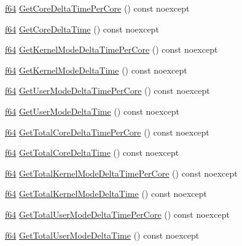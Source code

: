 \begin{DoxyCompactItemize}
\hyperlink{namespacemage_ab935747c6941320bd6214b5a5f265b09}{f64} \hyperlink{classmage_1_1_c_p_u_timer_a721f374b8ca33de787c744467d1e3656}{Get\+Core\+Delta\+Time\+Per\+Core} () const noexcept
\item 
\hyperlink{namespacemage_ab935747c6941320bd6214b5a5f265b09}{f64} \hyperlink{classmage_1_1_c_p_u_timer_a59d7c34a73f7f4eb670e93ac359c68e6}{Get\+Core\+Delta\+Time} () const noexcept
\item 
\hyperlink{namespacemage_ab935747c6941320bd6214b5a5f265b09}{f64} \hyperlink{classmage_1_1_c_p_u_timer_a448fd3861f8a1c1292abe62f23b7fa13}{Get\+Kernel\+Mode\+Delta\+Time\+Per\+Core} () const noexcept
\item 
\hyperlink{namespacemage_ab935747c6941320bd6214b5a5f265b09}{f64} \hyperlink{classmage_1_1_c_p_u_timer_aaa3e54ebc81f5d99e2f39e12d298e27b}{Get\+Kernel\+Mode\+Delta\+Time} () const noexcept
\item 
\hyperlink{namespacemage_ab935747c6941320bd6214b5a5f265b09}{f64} \hyperlink{classmage_1_1_c_p_u_timer_a9fc805a48140bec856b5bfe757299644}{Get\+User\+Mode\+Delta\+Time\+Per\+Core} () const noexcept
\item 
\hyperlink{namespacemage_ab935747c6941320bd6214b5a5f265b09}{f64} \hyperlink{classmage_1_1_c_p_u_timer_a8bbd3c5f38ad02ecb9f907a958c4c426}{Get\+User\+Mode\+Delta\+Time} () const noexcept
\item 
\hyperlink{namespacemage_ab935747c6941320bd6214b5a5f265b09}{f64} \hyperlink{classmage_1_1_c_p_u_timer_a38a95a2071856a92d75b1a588e7f8380}{Get\+Total\+Core\+Delta\+Time\+Per\+Core} () const noexcept
\item 
\hyperlink{namespacemage_ab935747c6941320bd6214b5a5f265b09}{f64} \hyperlink{classmage_1_1_c_p_u_timer_a2c2f4c9dc98036a4a69f96e91dbb8b5e}{Get\+Total\+Core\+Delta\+Time} () const noexcept
\item 
\hyperlink{namespacemage_ab935747c6941320bd6214b5a5f265b09}{f64} \hyperlink{classmage_1_1_c_p_u_timer_a88f3772e09fced4f551d1d9bd0e5b3ce}{Get\+Total\+Kernel\+Mode\+Delta\+Time\+Per\+Core} () const noexcept
\item 
\hyperlink{namespacemage_ab935747c6941320bd6214b5a5f265b09}{f64} \hyperlink{classmage_1_1_c_p_u_timer_ad4dde83f8b5db322e7a0ace33aaa5156}{Get\+Total\+Kernel\+Mode\+Delta\+Time} () const noexcept
\item 
\hyperlink{namespacemage_ab935747c6941320bd6214b5a5f265b09}{f64} \hyperlink{classmage_1_1_c_p_u_timer_afb9c6aee25bd70044ea0615a5a1bb75c}{Get\+Total\+User\+Mode\+Delta\+Time\+Per\+Core} () const noexcept
\item 
\hyperlink{namespacemage_ab935747c6941320bd6214b5a5f265b09}{f64} \hyperlink{classmage_1_1_c_p_u_timer_ae902f1aa7006ad96caadd558f6809ce7}{Get\+Total\+User\+Mode\+Delta\+Time} () const noexcept
\end{DoxyCompactItemize}
